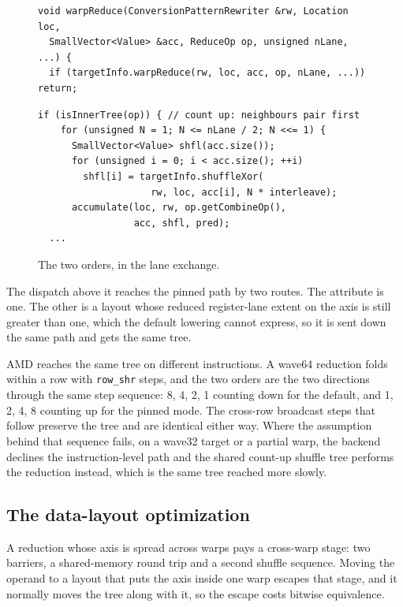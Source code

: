 \documentclass[sigplan,nonacm]{acmart}
\begin{document}
\begin{figure}[!ht]
\begin{lstlisting}[style=cpp]
void warpReduce(ConversionPatternRewriter &rw, Location loc, 
  SmallVector<Value> &acc, ReduceOp op, unsigned nLane, ...) {
  if (targetInfo.warpReduce(rw, loc, acc, op, nLane, ...)) return;
\end{lstlisting}
\begin{lstlisting}[style=cpp,backgroundcolor=\color{treebg}]
  if (isInnerTree(op)) { // count up: neighbours pair first
    for (unsigned N = 1; N <= nLane / 2; N <<= 1) {
      SmallVector<Value> shfl(acc.size());
      for (unsigned i = 0; i < acc.size(); ++i)
        shfl[i] = targetInfo.shuffleXor(
                    rw, loc, acc[i], N * interleave);
      accumulate(loc, rw, op.getCombineOp(),
                 acc, shfl, pred);
  ...
\end{lstlisting}

\caption{The two orders, in the lane exchange.}
\label{fig:innertree}
\end{figure}

The dispatch above it reaches the pinned path by two routes. The attribute is
one. The other is a layout whose reduced register-lane extent on the axis is
still greater than one, which the default lowering cannot express, so it is sent
down the same path and gets the same tree.



AMD reaches the same tree on different instructions. A wave64 reduction
folds within a row with \texttt{row\_shr} steps, and the two orders are the two
directions through the same step sequence: 8, 4, 2, 1 counting down for the
default, and 1, 2, 4, 8 counting up for the pinned mode. The cross-row broadcast
steps that follow preserve the tree and are identical either way. Where the
assumption behind that sequence fails, on a wave32 target or a partial warp, the
backend declines the instruction-level path and the shared count-up shuffle tree
performs the reduction instead, which is the same tree reached more slowly.

\subsection{The data-layout optimization}
\label{sec:enforcement-layout}

A reduction whose axis is spread across warps pays
a cross-warp stage: two barriers, a shared-memory round trip and a second
shuffle sequence. Moving the operand to a layout that puts the axis inside one warp
escapes that stage, and it normally moves the tree along with it, so the escape
costs bitwise equivalence.
\end{document}
